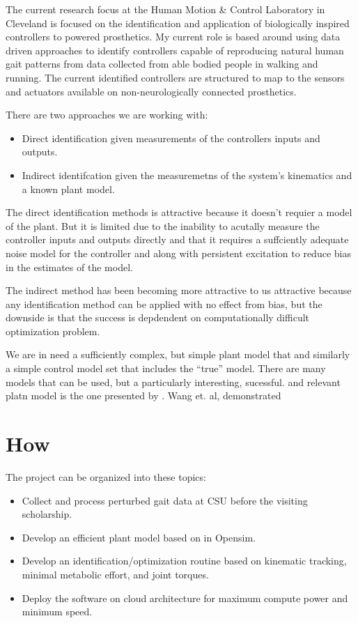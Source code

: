\documentclass[11pt]{article}
\begin{document}
The current research focus at the Human Motion \& Control Laboratory in
Cleveland is focused on the identification and application of biologically
inspired controllers to powered prosthetics. My current role is based around
using data driven approaches to identify controllers capable of reproducing
natural human gait patterns from data collected from able bodied people in
walking and running. The current identified controllers are structured to map
to the sensors and actuators available on non-neurologically connected
prosthetics.

There are two approaches we are working with:

\begin{itemize}
  \item Direct identification given measurements of the controllers inputs and
    outputs.
  \item Indirect identifcation given the measuremetns of the system's
    kinematics and a known plant model.
\end{itemize}

The direct identification methods is attractive because it doesn't requier a
model of the plant. But it is limited due to the inability to acutally measure
the controller inputs and outputs directly and that it requires a suffciently
adequate noise model for the controller and along with persistent excitation to
reduce bias in the estimates of the model.

The indirect method has been becoming more attractive to us attractive because
any identification method can be applied with no effect from bias, but the
downside is that the success is depdendent on computationally difficult
optimization problem.

We are in need a sufficiently complex, but simple plant model that and
similarly a simple control model set that includes the ``true'' model. There
are many models that can be used, but a particularly interesting, sucessful.
and relevant platn model is the one presented by \cite{Wang2012}. Wang et. al,
demonstrated 

\section*{How}

The project can be organized into these topics:

\begin{itemize}
  \item Collect and process perturbed gait data at CSU before the visiting
    scholarship.
  \item Develop an efficient plant model based on \cite{Wang2012} in Opensim.
  \item Develop an identification/optimization routine based on kinematic
    tracking, minimal metabolic effort, and joint torques.
  \item Deploy the software on cloud architecture for maximum compute power and
    minimum speed.
\end{itemize}
\end{document}
